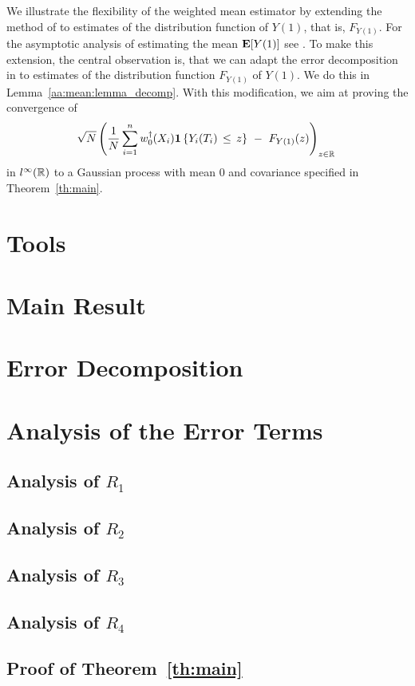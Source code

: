 We illustrate the flexibility of 
the weighted mean estimator by 
extending the method of \cite{Wang2019} to
estimates of 
the distribution function of $Y(1)$, that is, $F_{Y(1)}$.
For the asymptotic analysis of estimating the mean $\mathbf{E}[Y(1)]$ see \cite[Proof of Theorem~3]{Wang2019}.
To make this extension, the central observation is, that we can adapt the error decomposition in \cite[page 27]{Wang2019} 
to estimates of the distribution function $F_{Y(1)}$ of $Y(1)$.
We do this in Lemma~\ref{aa:mean:lemma_decomp}.
With this modification, we aim at proving
the convergence of
\begin{gather}
    \sqrt{N}
    \left( 
  \frac{1}{N}
    \sum_{i=1}^{n} 
    w_0^\dagger(X_i)
    \mathbf{1}\left\{ Y_i(T_i)\,\le\, z \right\}
    \ 
    -
    \ 
    F_{Y(1)}(z)
    \right)
    _{z\in\R}
    \,
  \end{gather}
  in
  $l^\infty(\mathbb{R})$
  to a Gaussian process with mean 0 and covariance specified in Theorem~\ref{th:main}.
\section{Tools}
  
\section{Main Result}
  
\section{Error Decomposition}
  
\section{Analysis of the Error Terms}
  \subsection{Analysis of $R_1$}
    
  \subsection{Analysis of $R_2$}
    
  \subsection{Analysis of $R_3$}
    
  \subsection{Analysis of $R_4$}
    
  \subsection{Proof of Theorem~\ref{th:main}}
    
